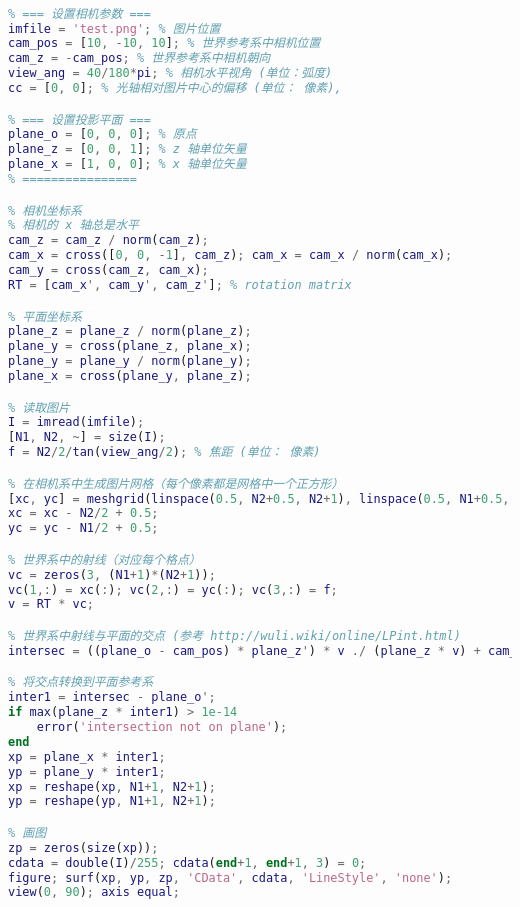 \begin{lstlisting}[language=matlab]
% 参数中矢量不必归一化

% === 设置相机参数 ===
imfile = 'test.png'; % 图片位置
cam_pos = [10, -10, 10]; % 世界参考系中相机位置
cam_z = -cam_pos; % 世界参考系中相机朝向
view_ang = 40/180*pi; % 相机水平视角 (单位：弧度)
cc = [0, 0]; % 光轴相对图片中心的偏移 (单位： 像素),

% === 设置投影平面 ===
plane_o = [0, 0, 0]; % 原点
plane_z = [0, 0, 1]; % z 轴单位矢量
plane_x = [1, 0, 0]; % x 轴单位矢量
% ================

% 相机坐标系
% 相机的 x 轴总是水平
cam_z = cam_z / norm(cam_z);
cam_x = cross([0, 0, -1], cam_z); cam_x = cam_x / norm(cam_x);
cam_y = cross(cam_z, cam_x);
RT = [cam_x', cam_y', cam_z']; % rotation matrix

% 平面坐标系
plane_z = plane_z / norm(plane_z);
plane_y = cross(plane_z, plane_x);
plane_y = plane_y / norm(plane_y);
plane_x = cross(plane_y, plane_z);

% 读取图片
I = imread(imfile);
[N1, N2, ~] = size(I);
f = N2/2/tan(view_ang/2); % 焦距 (单位： 像素)

% 在相机系中生成图片网格（每个像素都是网格中一个正方形）
[xc, yc] = meshgrid(linspace(0.5, N2+0.5, N2+1), linspace(0.5, N1+0.5, N1+1));
xc = xc - N2/2 + 0.5;
yc = yc - N1/2 + 0.5;

% 世界系中的射线（对应每个格点）
vc = zeros(3, (N1+1)*(N2+1));
vc(1,:) = xc(:); vc(2,:) = yc(:); vc(3,:) = f;
v = RT * vc;

% 世界系中射线与平面的交点 (参考 http://wuli.wiki/online/LPint.html)
intersec = ((plane_o - cam_pos) * plane_z') * v ./ (plane_z * v) + cam_pos';

% 将交点转换到平面参考系
inter1 = intersec - plane_o';
if max(plane_z * inter1) > 1e-14
    error('intersection not on plane');
end
xp = plane_x * inter1;
yp = plane_y * inter1;
xp = reshape(xp, N1+1, N2+1);
yp = reshape(yp, N1+1, N2+1);

% 画图
zp = zeros(size(xp));
cdata = double(I)/255; cdata(end+1, end+1, 3) = 0;
figure; surf(xp, yp, zp, 'CData', cdata, 'LineStyle', 'none');
view(0, 90); axis equal;
\end{lstlisting}
